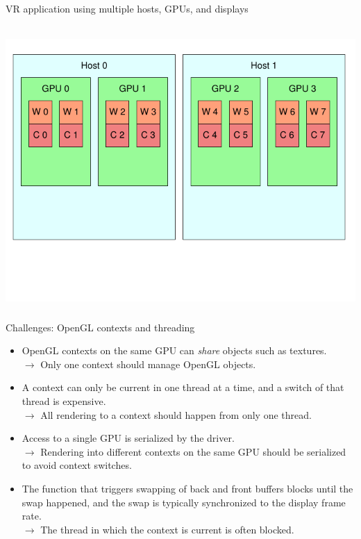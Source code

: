 \documentclass[utf8,stillsansserifmath,fleqn,t]{beamer}
\begin{document}
\begin{frame}
\frametitle{\insertsection}
\centerline{VR application using multiple hosts, GPUs, and displays}~\\
\includegraphics[height=.75\textheight]{./fig/setup-vr-unknown.pdf}
\end{frame}

\begin{frame}
\frametitle{\insertsection}
Challenges: OpenGL contexts and threading
\begin{itemize}
\item OpenGL contexts on the same GPU can \emph{share} objects
such as textures.\\
$\rightarrow$ Only one context should manage OpenGL objects.
\item A context can only be current in one thread at a time, and a
switch of that thread is expensive.\\
$\rightarrow$ All rendering to a context should happen from only one thread.
\item Access to a single GPU is serialized by the driver.\\
$\rightarrow$ Rendering into different contexts on the same GPU should be
serialized to avoid context switches.
\item The function that triggers swapping of back and front buffers 
blocks until the swap happened, and the swap is typically synchronized to the
display frame rate.\\
$\rightarrow$ The thread in which the context is current is often blocked.
\end{itemize}
\end{frame}
\end{document}
